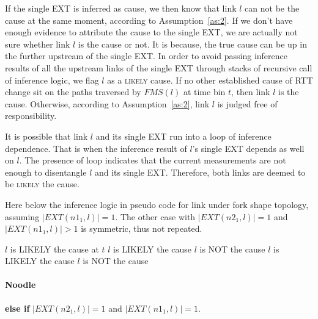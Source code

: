 If the single \ac{EXT} is inferred as cause, we then know that link $l$ can not be the cause at the same moment, according to Assumption~\ref{as:2}. If we don't have enough evidence to attribute the cause to the single \ac{EXT}, we are actually not sure whether link $l$ is the cause or not. It is because, the true cause can be up in the further upstream of the single \ac{EXT}. In order to avoid passing inference results of all the upstream links of the single \ac{EXT} through stacks of recursive call of inference logic, we flag $l$ as a \textsc{likely} cause.
If no other established cause of RTT change sit on the paths traversed by $FMS(l)$ at time bin $t$, then link $l$ is the cause. Otherwise, according to Assumption~\ref{as:2}, link $l$ is judged free of responsibility.

It is possible that link $l$ and its single \ac{EXT} run into a loop of inference dependence. That is when the inference result of $l$'s single \ac{EXT} depends as well on $l$. The presence of loop indicates that the current measurements are not enough to disentangle $l$ and its single \ac{EXT}. Therefore, both links are deemed to be \textsc{likely} the cause.

Here below the inference logic in pseudo code for link under fork shape topology, assuming $|EXT(n1_1,l)| = 1$. The other case with $|EXT(n2_1,l)| = 1$ and $|EXT(n1_1,l)| > 1$ is symmetric, thus not repeated.

\begin{algorithmic}
 
		\State $l$ is LIKELY the cause at $t$ 
	\Else {}
			\State $l$ is LIKELY the cause 
		\Else
				\State $l$ is NOT the cause 
			\Else
				\State $l$ is LIKELY the cause 
			\EndIf
		\EndIf
	\EndIf
\Else
	\State $l$ is NOT the cause
\EndIf
\end{algorithmic}

\paragraph{Noodle} \textbf{else if} $|EXT(n2_1,l)| = 1$ and $|EXT(n1_1,l)| = 1$.

